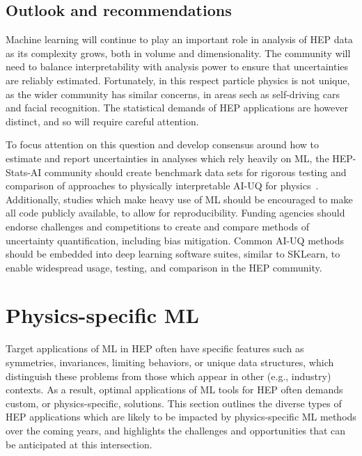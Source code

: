 \documentclass[submission,Phys]{SciPost}
\begin{document}
\subsection{Outlook and recommendations}

Machine learning will continue to play an important role in analysis of HEP data as its complexity grows, both in volume and dimensionality. The community will need to balance interpretability with analysis power to ensure that uncertainties are reliably estimated. Fortunately, in this respect particle physics is not unique, as the wider community has similar concerns, in areas sech as self-driving cars and facial recognition. The statistical demands of HEP applications are however distinct, and so will require careful attention.

To focus attention on this question and develop consensus around how to estimate and report uncertainties in analyses which rely heavily on ML, the HEP-Stats-AI community should create benchmark data sets for rigorous testing and comparison of approaches to physically interpretable AI-UQ for physics~\cite{https://doi.org/10.48550/arxiv.2208.03284}. Additionally, studies which make heavy use of ML should be encouraged to make all code publicly available, to allow for reproducibility. Funding agencies should endorse challenges and competitions to create and compare methods of uncertainty quantification, including bias mitigation. Common AI-UQ methods should be embedded into deep learning software suites, similar to SKLearn, to enable widespread usage, testing, and comparison in the HEP community.
    
\section{Physics-specific ML}
\label{sec:physicsspecificML}

Target applications of ML in HEP often have specific features such as symmetries, invariances, limiting behaviors, or unique data structures, which distinguish these problems from those which appear in other (e.g., industry) contexts. As a result, optimal applications of ML tools for HEP often demands custom, or physics-specific, solutions. This section outlines the diverse types of HEP applications which are likely to be impacted by physics-specific ML methods over the coming years, and highlights the challenges and opportunities that can be anticipated at this intersection.
\end{document}
